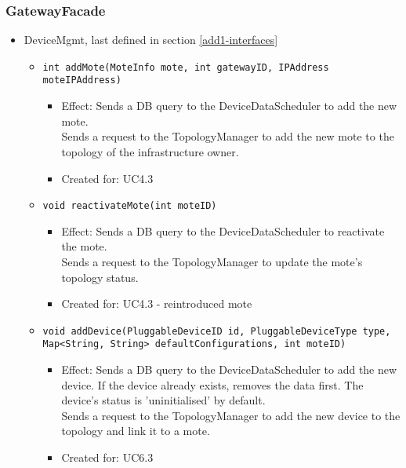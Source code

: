     \subsubsection{GatewayFacade}
        \begin{itemize}
            \item DeviceMgmt, last defined in section \ref{add1-interfaces}
            \begin{itemize}
                \item \texttt{int addMote(MoteInfo mote, int gatewayID, IPAddress moteIPAddress)}
                    \begin{itemize}
                        \item Effect: Sends a DB query to the DeviceDataScheduler to add the new mote. \\
                              Sends a request to the TopologyManager to add the new mote to the topology of the infrastructure owner.
                        \item Created for: UC4.3
                    \end{itemize}
                \item \texttt{void reactivateMote(int moteID)}
                    \begin{itemize}
                        \item Effect: Sends a DB query to the DeviceDataScheduler to reactivate the mote. \\
                              Sends a request to the TopologyManager to update the mote's topology status.
                        \item Created for: UC4.3 - reintroduced mote
                    \end{itemize}
                \item \texttt{void addDevice(PluggableDeviceID id, PluggableDeviceType type, Map<String, String> defaultConfigurations, int moteID)}
                    \begin{itemize}
                        \item Effect: Sends a DB query to the DeviceDataScheduler to add the new device. If the device already exists, removes the data first. The device's status is 'uninitialised' by default. \\
                              Sends a request to the TopologyManager to add the new device to the topology and link it to a mote.
                        \item Created for: UC6.3
                    \end{itemize}

\end{itemize}
\end{itemize}
